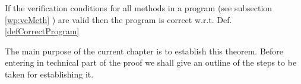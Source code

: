 \begin{vcGenCorrect}\label{vcGenCorrect}

If the verification conditions  for all  methods in a program   (see  subsection \ref{wp:vcMeth} )
are valid then the program is correct w.r.t. Def. \ref{defCorrectProgram}
%        

\end{vcGenCorrect}

The main purpose of the current chapter is to establish this theorem. Before entering in technical part of the proof
we shall give an outline of the steps to be taken for establishing it.


